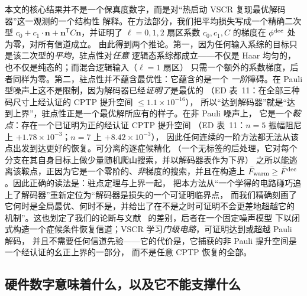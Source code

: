 \documentclass[11pt,a4paper]{article}
\begin{document}
本文的核心结果并不是一个保真度数字，而是对“热启动 VSCR 复现最优解码器”这一观测的一个结构性
解释。在方法部分，我们把平均损失写成一个精确二次型
$c_0+c_1\cdot\mathbf n+\mathbf n^{\mathsf T}C\mathbf n$，并证明了
$\ell=0,1,2$ 扇区系数 $c_0,c_1,C$ 的梯度在 $\phi^{\rm dec}$ 处为零，对所有信道成立。
由此得到两个推论。第一，因为任何输入系综的目标只是该二次型的\emph{平均}，驻点性对\emph{任意}
逻辑态系综都成立——不仅是 Haar 均匀的，也不仅是纯态的；而混合逻辑输入（$\ell=1$ 扇区）
只需一个额外的系数梯度，后者同样为零。第二，驻点性并不蕴含最优性：它蕴含的是一个
\emph{一阶}障碍。在 Pauli 型噪声上这不是限制，因为解码器已经\emph{证明了}是最优的
（ED 表~11：在全部三种码尺寸上经认证的 CPTP 提升空间 $\le1.1\times10^{-16}$），
所以“达到解码器”就是“达到上界”，驻点性正是一个最优解所应有的样子。在非 Pauli 噪声上，
它是一个\emph{鞍点}：存在一个已证明为正的经认证 CPTP 提升空间
（ED 表~11：$n=5$ 振幅阻尼上 $+1.78\times10^{-3}$；$n=7$ 上 $+8.42\times10^{-3}$），
因此任何连续的一阶方法都无法从该点出发到达更好的恢复。可分离的逐症候精化
（一个无标签的后处理，它对每个分支在其自身目标上做少量随机爬山搜索，并以解码器表作为下界）
之所以能逃离该鞍点，正因为它是一个零阶的、\emph{非}梯度的搜索，并且在构造上
$\bar F_{\rm warm}\ge\bar F^{\rm dec}$。因此正确的读法是：驻点定理与上界一起，
把本方法从“一个学得的电路碰巧追上了解码器”重新定位为“解码器是损失的一个可证明临界点，
而我们精确刻画了它何时是全局最优、何时不是，并给出了在不是之时可证明不会更差地超越它的
机制”。这也划定了我们的论断与文献~\cite{biswas_syndrome_petz} 的差别，后者在一个固定噪声模型
下以闭式构造一个症候条件恢复信道；VSCR 学习\emph{门级电路}，可证明达到或超越 Pauli 解码，
并且不需要任何信道先验——它的代价是，它捕获的非 Pauli 提升空间是一个经认证的幺正上界的一部分，
而不是任意 CPTP 恢复的全部。

\subsection*{硬件数字意味着什么，以及它不能支撑什么}
\end{document}
